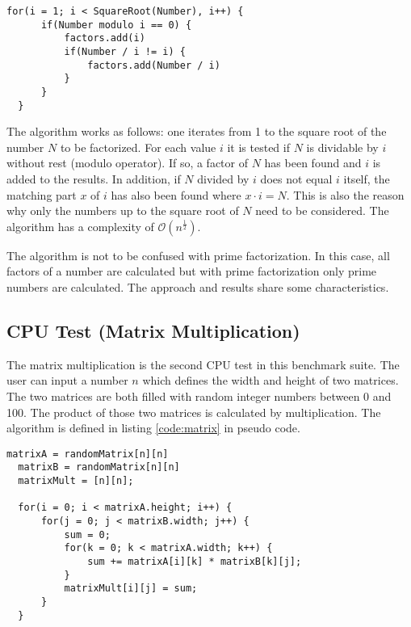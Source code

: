 \begin{minipage}{\linewidth}
\begin{lstlisting}[frame=single,caption={Factorization test pseudo code},label=code:factors,linewidth=.75\textwidth,xleftmargin=.25\textwidth]
  for(i = 1; i < SquareRoot(Number), i++) {
      if(Number modulo i == 0) {
          factors.add(i)
          if(Number / i != i) {
              factors.add(Number / i)
          }
      }
  }
\end{lstlisting}
\end{minipage}

The algorithm works as follows: one iterates from 1 to the square root of the number $N$ to be factorized. For each value $i$ it is tested if $N$ is dividable by $i$ without rest (modulo operator). If so, a factor of $N$ has been found and $i$ is added to the results. In addition, if $N$ divided by $i$ does not equal $i$ itself, the matching part $x$ of $i$ has also been found where $x \cdot i = N$. This is also the reason why only the numbers up to the square root of $N$ need to be considered. The algorithm has a complexity of $\mathcal{O}(n^{\frac{1}{2}})$.

\begin{remark}
The algorithm is not to be confused with prime factorization. In this case, all factors of a number are calculated but with prime factorization only prime numbers are calculated. The approach and results share some characteristics.
\end{remark}

\subsection{CPU Test (Matrix Multiplication)}
The matrix multiplication is the second \gls{CPU} test in this benchmark suite. The user can input a number $n$ which defines the width and height of two matrices. The two matrices are both filled with random integer numbers between 0 and 100. The product of those two matrices is calculated by multiplication. The algorithm is defined in listing \ref{code:matrix} in pseudo code.

\begin{minipage}{\linewidth}
\begin{lstlisting}[frame=single,caption={Matrix multiplication test pseudo code},label=code:matrix,linewidth=0.8\textwidth,xleftmargin=.2\textwidth]
  matrixA = randomMatrix[n][n]
  matrixB = randomMatrix[n][n]
  matrixMult = [n][n];
  
  for(i = 0; i < matrixA.height; i++) {
      for(j = 0; j < matrixB.width; j++) {
          sum = 0;
          for(k = 0; k < matrixA.width; k++) {
              sum += matrixA[i][k] * matrixB[k][j];
          }
          matrixMult[i][j] = sum;
      }
  }
\end{lstlisting}
\end{minipage}
\newline


